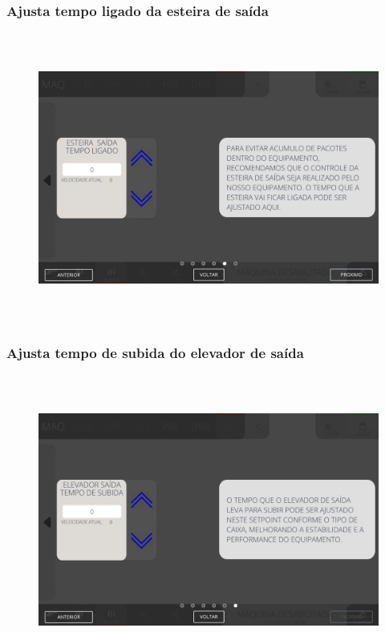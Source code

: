 \newpage
\thispagestyle{fancy}
\vspace*{\fill}
\subsubsection{\small{Ajusta tempo ligado da esteira de saída}}
\begin{figure}[h]
  \centering
  \includegraphics[width=576px,height=360px]{src/imagesFlexo/08-count/settings/e-11.png}
\end{figure}
\vspace*{\fill}


\newpage
\thispagestyle{fancy}
\vspace*{\fill}
\subsubsection{\small{Ajusta tempo de subida do elevador de saída}}
\begin{figure}[h]
  \centering
  \includegraphics[width=576px,height=360px]{src/imagesFlexo/08-count/settings/e-12.png}
\end{figure}
\vspace*{\fill}
